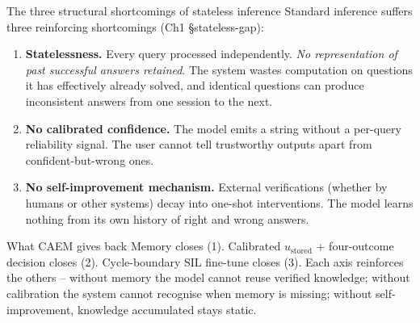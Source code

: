 \documentclass[10pt,aspectratio=169]{beamer}
\begin{document}
\begin{frame}{The three structural shortcomings of stateless inference}
  Standard inference suffers \alert{three reinforcing shortcomings} (Ch1 \S stateless-gap):

  \vspace{0.5em}
  \begin{enumerate}\small
    \item \textbf{Statelessness.} Every query processed independently. \emph{No representation of past successful answers retained}. The system wastes computation on questions it has effectively already solved, and identical questions can produce inconsistent answers from one session to the next.
    \item \textbf{No calibrated confidence.} The model emits a string without a per-query reliability signal. The user cannot tell trustworthy outputs apart from confident-but-wrong ones.
    \item \textbf{No self-improvement mechanism.} External verifications (whether by humans or other systems) decay into one-shot interventions. The model learns nothing from its own history of right and wrong answers.
  \end{enumerate}

  \vspace{0.5em}
  \begin{block}{What CAEM gives back}
    Memory closes (1). Calibrated $u_{\text{stored}}$ + four-outcome decision closes (2). Cycle-boundary SIL fine-tune closes (3). Each axis reinforces the others -- without memory the model cannot reuse verified knowledge; without calibration the system cannot recognise when memory is missing; without self-improvement, knowledge accumulated stays static.
  \end{block}
\end{frame}
\end{document}
